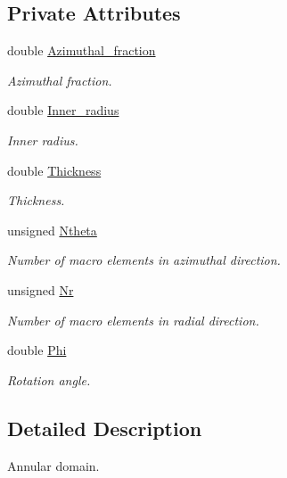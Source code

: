 \subsection*{Private Attributes}
\begin{DoxyCompactItemize}
\item 
double \hyperlink{classoomph_1_1AnnularDomain_ac6ea648ff2b80c412c6aec3a071945af}{Azimuthal\+\_\+fraction}
\begin{DoxyCompactList}\small\item\em Azimuthal fraction. \end{DoxyCompactList}\item 
double \hyperlink{classoomph_1_1AnnularDomain_a41bead396f1b49783caf334e56a6eb23}{Inner\+\_\+radius}
\begin{DoxyCompactList}\small\item\em Inner radius. \end{DoxyCompactList}\item 
double \hyperlink{classoomph_1_1AnnularDomain_a34008644354ffc3e7f48505557d95755}{Thickness}
\begin{DoxyCompactList}\small\item\em Thickness. \end{DoxyCompactList}\item 
unsigned \hyperlink{classoomph_1_1AnnularDomain_a42f197d2b806a961395f905d947b3e6e}{Ntheta}
\begin{DoxyCompactList}\small\item\em Number of macro elements in azimuthal direction. \end{DoxyCompactList}\item 
unsigned \hyperlink{classoomph_1_1AnnularDomain_a0cbd02650762aa5b6baf32936e553b64}{Nr}
\begin{DoxyCompactList}\small\item\em Number of macro elements in radial direction. \end{DoxyCompactList}\item 
double \hyperlink{classoomph_1_1AnnularDomain_a0280549bd7a88cabb84a7223ed114040}{Phi}
\begin{DoxyCompactList}\small\item\em Rotation angle. \end{DoxyCompactList}\end{DoxyCompactItemize}


\subsection{Detailed Description}
Annular domain. 


